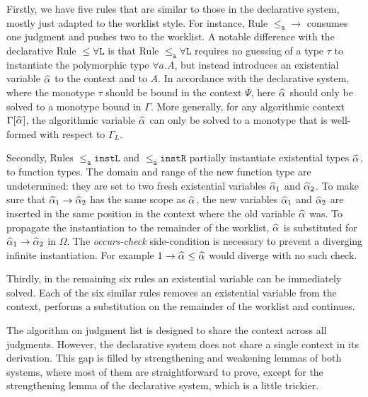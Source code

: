 Firstly, we have five rules that are similar to those in the declarative
system, mostly just adapted to the worklist style. For instance, Rule
$\mathtt{{\le_a}{\to}}$ consumes one judgment and pushes two to the
worklist.  A notable difference with the declarative Rule $\mathtt{{\le}\forall
L}$ is that Rule $\mathtt{{\le_a}\forall L}$ requires no guessing of a type $\tau$ to instantiate
the polymorphic type $\forall a. A$, but instead
introduces an existential variable $\al$ to the context and to $A$. In
accordance with the declarative system, where 
the monotype $\tau$ should be bound in the context $\Psi$, here $\al$ should only
be solved to a monotype bound in $\Gamma$. More generally, for any algorithmic context $\Gamma[\al]$, the algorithmic variable $\al$ 
can only be solved to a monotype that is well-formed with respect to $\Gamma_L$.

Secondly, Rules $\mathtt{{\le_a}instL}$ and $\mathtt{{\le_a}instR}$ partially
instantiate existential types $\al$, to function types. The domain and range
of the new function type are undetermined: they are set to two
fresh existential variables $\al[1]$ and $\al[2]$. To make sure that
$\al[1] \to \al[2]$ has the same scope as $\al$, the new variables
$\al[1]$ and $\al[2]$ are inserted in the same position in the context
where the old variable $\al$ was. To propagate the instantiation to the remainder
of the worklist, $\al$ is substituted for $\al[1] \to \al[2]$ in $\Omega$.
The \emph{occurs-check} side-condition is necessary to prevent a diverging
infinite instantiation. For example
$1 \to \al \le \al$ would diverge with no such check.

Thirdly, in the remaining six rules an existential variable can be immediately
solved. Each of the six similar rules removes an existential variable from the
context,  performs a substitution on the remainder of the worklist and
continues.

The algorithm on judgment list is designed to share the context across all judgments.
However, the declarative system does not share a single context in its derivation.
This gap is filled by strengthening and weakening lemmas of both systems,
where most of them are straightforward to prove,
except for the strengthening lemma of the declarative system, which is a little trickier.

